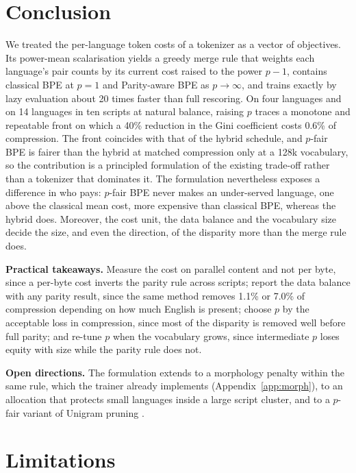 \section{Conclusion}
\label{sec:conclusion}

We treated the per-language token costs of a tokenizer as a vector of objectives. Its
power-mean scalarisation yields a greedy merge rule that weights each language's pair counts
by its current cost raised to the power $p-1$, contains classical BPE at $p=1$ and
Parity-aware BPE as $p\to\infty$, and trains exactly by lazy evaluation about 20 times
faster than full rescoring. On four languages and on 14 languages in ten scripts at natural balance, raising $p$ traces
a monotone and repeatable front on which a 40\% reduction in the Gini coefficient costs
0.6\% of compression. The front coincides with that of the hybrid schedule, and $p$-fair BPE
is fairer than the hybrid at matched compression only at a 128k vocabulary, so the
contribution is a principled formulation of the existing trade-off rather than a tokenizer
that dominates it. The formulation nevertheless exposes a difference in who pays: $p$-fair
BPE never makes an under-served language, one above the classical mean cost, more expensive
than classical BPE, whereas the hybrid does. Moreover, the cost unit, the data balance and
the vocabulary size decide the size, and even the direction, of the disparity more than the
merge rule does.

\noindent\textbf{Practical takeaways.} Measure the cost on parallel content and not per
byte, since a per-byte cost inverts the parity rule across scripts; report the data balance
with any parity result, since the same method removes 1.1\% or 7.0\% of compression
depending on how much English is present; choose $p$ by the acceptable loss in compression,
since most of the disparity is removed well before full parity; and re-tune $p$ when the
vocabulary grows, since intermediate $p$ loses equity with size while the parity rule does
not.

\noindent\textbf{Open directions.} The formulation extends to a morphology penalty within the
same rule, which the trainer already implements (Appendix~\ref{app:morph}), to an allocation
that protects small languages inside a large script cluster, and to a $p$-fair variant of
Unigram pruning \citep{kudo2018}.

\section*{Limitations}

